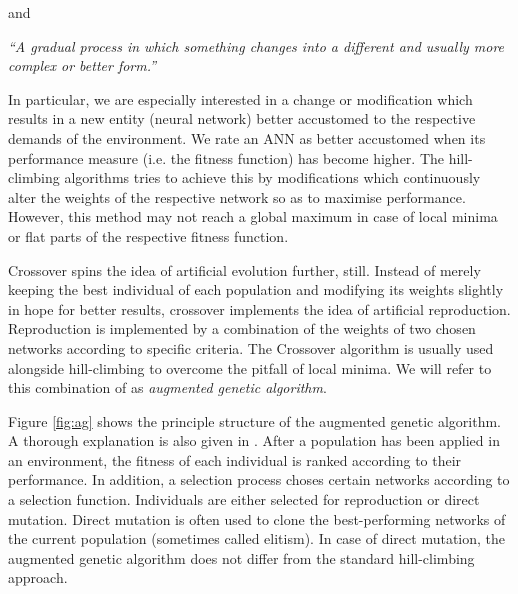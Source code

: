 \documentclass[10pt,a4paper,DIV=11]{scrreprt}
\begin{document}
and

\begin{center}
\textit{“A gradual process in which something changes into a different and usually more complex or better form.”}\\ 
\end{center}

In particular, we are especially interested in a change or modification which results in a new entity (neural network) better accustomed to the 
respective demands of the environment.  We rate an ANN as better accustomed when its performance measure (i.e. the fitness function) has become 
higher. The hill-climbing algorithms tries to achieve this by modifications which continuously alter the weights of the respective network so 
as to maximise performance. However, this method may not reach a global maximum in case of local minima or flat parts of the respective fitness 
function.

Crossover spins the idea of artificial evolution further, still. Instead of merely keeping the best individual of each population and modifying 
its weights slightly in hope for better results, crossover implements the idea of artificial reproduction. Reproduction is implemented by a 
combination of the weights of two chosen networks according to specific criteria. The Crossover algorithm is usually used alongside hill-climbing 
to overcome the pitfall of local minima. We will refer to this combination of as \textit{augmented genetic algorithm}.

Figure \ref{fig:ag} shows the principle structure of the augmented genetic algorithm. A thorough explanation is also given in \cite{CROSSOVER}.
After a population has been applied in an environment, the fitness of each individual is ranked according to their performance.  
In addition, a selection process choses certain networks according to a selection function. Individuals are either selected for reproduction 
or direct mutation. Direct mutation is often used to clone the best-performing networks of the current population (sometimes called elitism). 
In case of direct mutation, the augmented genetic algorithm does not differ from the standard hill-climbing approach.
\end{document}
